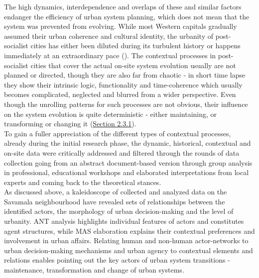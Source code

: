 \documentclass[11pt]{report}
\begin{document}
{{{{The high dynamics, interdependence and overlaps of these and similar factors endanger the efficiency of urban system planning, which does not mean that the system was prevented from evolving. While most Western capitals gradually assumed their urban coherence and cultural identity, the urbanity of post-socialist cities has either been diluted during its turbulent history or happens immediately at an extraordinary pace  (\href{Doytchinov}{\citealt{doytchinov_modernization_2015}}).
The contextual processes in post-socialist cities that cover the actual on-site system evolution usually are not planned or directed, though they are also far from chaotic - in short time lapse they show their intrinsic logic, functionality and time-coherence which usually becomes complicated, neglected and blurred from a wider perspective. Even though the unrolling patterns for such processes are not obvious, their influence on the system evolution is quite deterministic - either maintaining, or transforming or changing it (\href{Section 2.3.1}{Section 2.3.1}). 
\\

To gain a fuller appreciation of the different types of contextual processes, already during the initial research phase, the dynamic, historical, contextual and on-site data were critically addressed and filtered through the rounds of data collection going from an abstract document-based version through group analysis in professional, educational workshops and elaborated interpretations from local experts and coming back to the theoretical stances.
\\

As discussed above, a kaleidoscope of collected and analyzed data on the Savamala neighbourhood have revealed sets of relationships between the identified actors, the morphology of urban decision-making and the level of urbanity. ANT analysis highlights individual features of actors and constitutes agent structures, while MAS elaboration explains their contextual preferences and involvement in urban affairs. Relating human and non-human actor-networks to urban decision-making mechanisms and urban agency to contextual elements and relations enables pointing out the key actors of urban system transitions - maintenance, transformation and change of urban systems.
\\

}}}}
\end{document}
